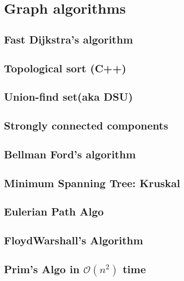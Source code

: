 \section{Graph algorithms}
\subsection{Fast Dijkstra's algorithm}
\raggedbottom
\hrulefill
\subsection{Topological sort (C++)}
\raggedbottom
\hrulefill
\subsection{Union-find set(aka DSU)}
\raggedbottom
\hrulefill
\subsection{Strongly connected components}
\raggedbottom
\hrulefill
\subsection{Bellman Ford's algorithm}
\raggedbottom
\hrulefill
\subsection{Minimum Spanning Tree: Kruskal}
\raggedbottom
\hrulefill
\subsection{Eulerian Path Algo}
\raggedbottom
\hrulefill
\subsection{FloydWarshall's Algorithm}
\raggedbottom
\hrulefill
\subsection{Prim's Algo in $\mathcal{O}(n^2)$ time}
\raggedbottom
\hrulefill
